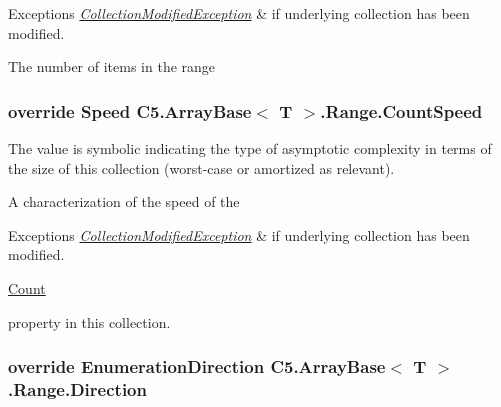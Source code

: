 \begin{DoxyExceptions}{Exceptions}
{\em \hyperlink{class_c5_1_1_collection_modified_exception}{Collection\+Modified\+Exception}} & if underlying collection has been modified.\\
\hline
\end{DoxyExceptions}


The number of items in the range\hypertarget{class_c5_1_1_array_base_1_1_range_abc096a489b1c0c705679b18c08cdfa02}{}
\subsubsection[{Count\+Speed}]{\setlength{\rightskip}{0pt plus 5cm}override {\bf Speed} {\bf C5.\+Array\+Base}$<$ T $>$.Range.\+Count\+Speed\hspace{0.3cm}{\ttfamily [get]}}\label{class_c5_1_1_array_base_1_1_range_abc096a489b1c0c705679b18c08cdfa02}


The value is symbolic indicating the type of asymptotic complexity in terms of the size of this collection (worst-\/case or amortized as relevant). 

A characterization of the speed of the 
\begin{DoxyExceptions}{Exceptions}
{\em \hyperlink{class_c5_1_1_collection_modified_exception}{Collection\+Modified\+Exception}} & if underlying collection has been modified.\\
\hline
\end{DoxyExceptions}

\begin{DoxyCode}
\hyperlink{class_c5_1_1_array_base_1_1_range_acf73ad1c77ff0b7eee1894fd467baf88}{Count}
\end{DoxyCode}
 property in this collection.\hypertarget{class_c5_1_1_array_base_1_1_range_ad2a7c1b607ef9082829d9f71f3e459fe}{}
\subsubsection[{Direction}]{\setlength{\rightskip}{0pt plus 5cm}override {\bf Enumeration\+Direction} {\bf C5.\+Array\+Base}$<$ T $>$.Range.\+Direction\hspace{0.3cm}{\ttfamily [get]}}\label{class_c5_1_1_array_base_1_1_range_ad2a7c1b607ef9082829d9f71f3e459fe}




